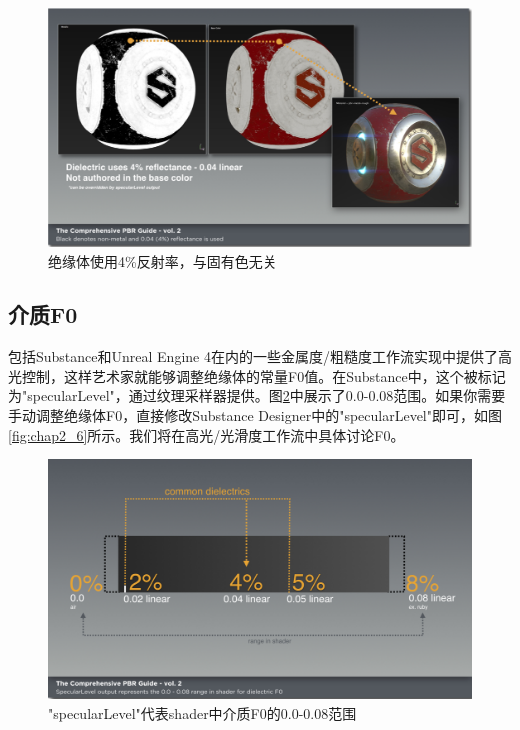 \begin{figure}[ht]
    \centering
	\includegraphics[width=\textwidth]{images/chap2_4.png}
	\caption{绝缘体使用4\%反射率，与固有色无关}
    \label{fig:chap2_4}
\end{figure}

\subsection{介质F0}

包括Substance和Unreal Engine 4在内的一些金属度/粗糙度工作流实现中提供了高光控制，这样艺术家就能够调整绝缘体的常量F0值。在Substance中，这个被标记为"specularLevel"，通过纹理采样器提供。图\ref{fig:chap2_5}中展示了0.0-0.08范围。如果你需要手动调整绝缘体F0，直接修改Substance Designer中的"specularLevel"即可，如图\ref{fig:chap2_6}所示。我们将在高光/光滑度工作流中具体讨论F0。

\begin{figure}[ht]
    \centering
	\includegraphics[width=\textwidth]{images/chap2_5.png}
	\caption{"specularLevel"代表shader中介质F0的0.0-0.08范围}
    \label{fig:chap2_5}
\end{figure}

